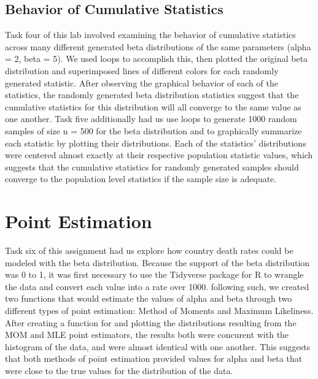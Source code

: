\documentclass{article}\usepackage[]{graphicx}\usepackage[]{xcolor}
\begin{document}
\begin{multicols}{2}
\subsection{Behavior of Cumulative Statistics}
Task four of this lab involved examining the behavior of cumulative statistics across many different generated beta distributions of the same parameters (alpha = 2, beta = 5). We used loops to accomplish this, then plotted the original beta distribution and superimposed lines of different colors for each randomly generated statistic. After observing the graphical behavior of each of the statistics, the randomly generated beta distribution statistics suggest that the cumulative statistics for this distribution will all converge to the same value as one another. Task five additionally had us use loops to generate 1000 random samples of size n = 500 for the beta distribution and to graphically summarize each statistic by plotting their distributions. Each of the statistics' distributions were centered almost exactly at their respective population statistic values, which suggests that the cumulative statistics for randomly generated samples should converge to the population level statistics if the sample size is adequate.

\section{Point Estimation}
Task six of this assignment had us explore how country death rates could be modeled with the beta distribution. Because the support of the beta distribution was 0 to 1, it was first necessary to use the Tidyverse package for R to wrangle the data and convert each value into a rate over 1000. following such, we created two functions that would estimate the values of alpha and beta through two different types of point estimation: Method of Moments and Maximum Likeliness. After creating a function for and plotting the distributions resulting from the MOM and MLE point estimators, the results both were concurent with the histogram of the data, and were almost identical with one another. This suggests that both methods of point estimation provided values for alpha and beta that were close to the true values for the distribution of the data.



\end{multicols}
\end{document}
